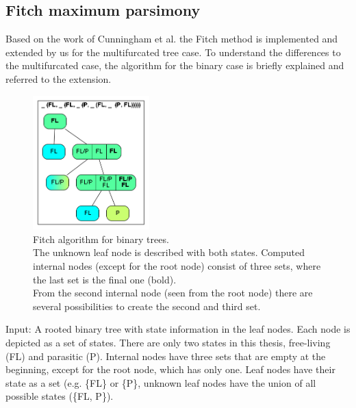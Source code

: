     \subsection{Fitch maximum parsimony}
      Based on the work of Cunningham et al. \cite{Cunningham1998} the Fitch method \cite{Fitch1971} 
        is implemented and extended by us for the multifurcated tree case. To understand the 
        differences to the multifurcated case, the algorithm for the binary case is briefly explained 
        and referred to the extension. \\
        \begin{figure}
          \centering
          \includegraphics[width=0.4\textwidth]{Figures/Fitch1.png}
          \caption{Fitch algorithm for binary trees. \\
            The unknown leaf node is described with both states. Computed internal nodes (except for the 
            root node) consist of three sets, where the last set is the final one (bold). \\
            From the second internal node (seen from the root node) there are several possibilities to 
            create the second and third set.}
          \label{fig: binary Fitch}
        \end{figure}
      Input: A rooted binary tree with state information in the leaf nodes. Each node is depicted as 
        a set of states. There are only two states in this thesis, free-living (FL) and parasitic (P).
        Internal nodes have three sets that are empty at the beginning, except for the root node, which
        has only one. Leaf nodes have their state as a set (e.g. \{FL\} or \{P\}, unknown leaf nodes 
        have the union of all possible states (\{FL, P\}).

